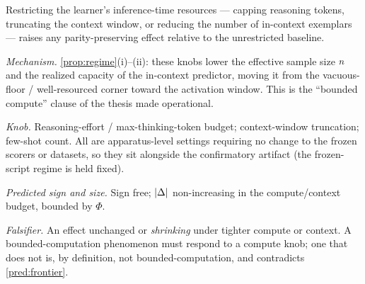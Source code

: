 \begin{prediction}
\label{pred:compute}
Restricting the learner's inference-time resources --- capping reasoning tokens,
truncating the context window, or reducing the number of in-context exemplars
--- raises any parity-preserving effect relative to the unrestricted baseline.\par
\emph{Mechanism.} \cref{prop:regime}(i)--(ii): these knobs lower the effective
sample size $n$ and the realized capacity of the in-context predictor,
moving it from the vacuous-floor / well-resourced corner toward the activation
window. This is the ``bounded compute'' clause of the thesis made operational.\par
\emph{Knob.} Reasoning-effort / max-thinking-token budget; context-window
truncation; few-shot count. All are apparatus-level settings requiring no change
to the frozen scorers or datasets, so they sit alongside the confirmatory
artifact (the frozen-script regime is held fixed).\par
\emph{Predicted sign and size.} Sign free; $|\Delta|$ non-increasing in the
compute/context budget, bounded by $\Phi$.\par
\emph{Falsifier.} An effect unchanged or \emph{shrinking} under tighter compute
or context. A bounded-computation phenomenon must respond to a compute knob; one
that does not is, by definition, not bounded-computation, and contradicts
\cref{pred:frontier}.
\end{prediction}

